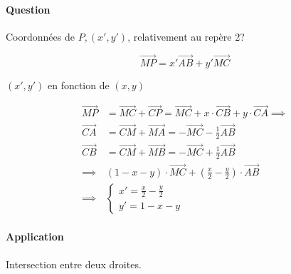 \documentclass[
    11pt,
    a4paper,
    oneside,
    headinlcude, footinclude,
    twoside,
]{report}
\renewcommand{\vec}[1]{\overrightarrow{#1}}
\begin{document}
\paragraph{Question}
\label{par:question}

Coordonnées de $P, (x', y')$, relativement au repère 2?

$$\vec{MP} = x' \vec{AB} + y' \vec{MC}$$

$(x', y')$ en fonction de $(x, y)$


\[
    \begin{split}
        \vec{MP} &= \vec{MC} + \vec{CP} = \vec{MC} + x \cdot \vec{CB} + y
        \cdot \vec{CA} \implies \\
        \vec{CA} &= \vec{CM} + \vec{MA} = - \vec{MC} - \frac{1}{2} \vec{AB}\\
        \vec{CB} &= \vec{CM} + \vec{MB} = - \vec{MC} + \frac{1}{2} \vec{AB}\\
        \implies & (1 - x - y) \cdot \vec{MC} + \left(\frac{x}{2} - \frac{y}{2}\right)
        \cdot \vec{AB}\\
        \implies & \left\{\begin{array}{l}x' = \frac{x}{2} - \frac{y}{2} \\ y'=
        1 - x - y\end{array}\right.
    \end{split}
\]


\paragraph{Application}
\label{par:application}

Intersection entre deux droites.
\end{document}
